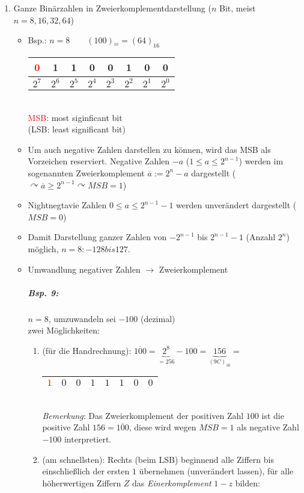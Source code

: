 \begin{enumerate}
\item Ganze Binärzahlen in Zweierkomplementdarstellung ($n$ Bit, meist $n=8,16,32,64$)
\begin{itemize}
\item Bsp.: $n=8 \qquad (100)_{^10}=(64)_{16}$\\
\begin{tabular}{|c | c | c |c | c | c |c | c |}
\hline
\textcolor{red}{0} & 1 &1&0&0&1&0&0\\
\hline
$2^7$&$2^6$&$2^5$&$2^4$&$2^3$&$2^2$&$2^1$&$2^0$\\
\hline
\end{tabular}\\
\textcolor{red}{MSB}: most siginficant bit\\
(LSB: least significant bit)
\item Um auch negative Zahlen darstellen zu können, wird das MSB als Vorzeichen reserviert. Negative Zahlen $-a$ ($1\leq a \leq 2^{n-1}$) werden im sogenannten Zweierkomplement $\overline{a}:=2^n-a$ dargestellt ($\curvearrowright \overline{a}\geq 2^{n-1} \curvearrowright MSB =1$)
\item Nightnegtavie Zahlen $0\leq a \leq 2^{n-1}-1$ werden unverändert dargestellt ($MSB=0$)
\item Damit Darstellung ganzer Zahlen von $-2^{n-1}$ bis $2^{n-1}-1$ (Anzahl $2^n$) möglich, $n=8: -128 bis 127$.
\item Umwandlung negativer Zahlen $\rightarrow$ Zweierkomplement
\subparagraph{Bsp. 9:} $n=8$, umzuwandeln sei $-100$ (dezimal)\\
zwei Möglichkeiten:
\begin{enumerate}[label=\arabic*.)]
\item  (für die Handrechnung): $\overline{100}=\underbrace{2^8}_{=256}-100=\underbrace{156}_{(9C)_{16}}=$\begin{tabular}{|c|c c c|c c c c|}
\hline
\textcolor{red}{$1$}&$0$&$0$&$1$&$1$&$1$&$0$&$0$\\
\hline
\end{tabular}\\
\emph{Bemerkung}: Das Zweierkomplement der positiven Zahl $100$ ist die positive Zahl $156=\overline{100}$, diese wird wegen $MSB=1$ als negative Zahl $-100$ interpretiert.
\item (am schnellsten): Rechts (beim LSB) beginnend alle Ziffern bis einschließlich der ersten $1$ übernehmen (unverändert lassen), für alle höherwertigen Ziffern $Z$ das \emph{Einerkomplement} $1-z$ bilden:\\

\end{enumerate}
\end{itemize}
\end{enumerate}
